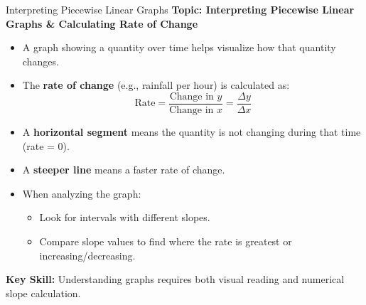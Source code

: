 \documentclass{beamer}
\begin{document}
\begin{frame}{Interpreting Piecewise Linear Graphs}
    \textbf{Topic: Interpreting Piecewise Linear Graphs \& Calculating Rate of Change}

    \begin{itemize}
        \item A graph showing a quantity over time helps visualize how that quantity changes.
        \item The \textbf{rate of change} (e.g., rainfall per hour) is calculated as:
        \[
        \text{Rate} = \frac{\text{Change in } y}{\text{Change in } x} = \frac{\Delta y}{\Delta x}
        \]
        \item A \textbf{horizontal segment} means the quantity is not changing during that time (rate = 0).
        \item A \textbf{steeper line} means a faster rate of change.
        \item When analyzing the graph:
        \begin{itemize}
            \item Look for intervals with different slopes.
            \item Compare slope values to find where the rate is greatest or increasing/decreasing.
        \end{itemize}
    \end{itemize}

    \vspace{1em}
    \textbf{Key Skill:}  
    Understanding graphs requires both visual reading and numerical slope calculation.
\end{frame}
\end{document}
